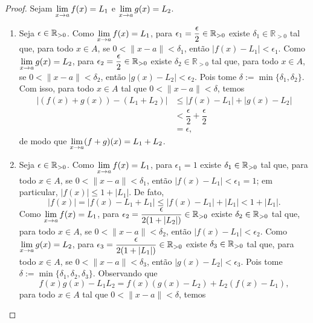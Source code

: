 \begin{proof}
    Sejam $\displaystyle \lim_{x \to a} f(x) = L_1$ e $\displaystyle \lim_{x \to a} g(x) = L_2$.
        \begin{enumerate}[leftmargin=*, align=left, label=\textbf{(\alph*)}]
            \item Seja $\epsilon \in \mathbb{R}_{>0}$. Como $\displaystyle \lim_{x \to a} f(x) = L_1$, para $\displaystyle \epsilon_1 = \dfrac{\epsilon}{2} \in \mathbb{R}_{>0}$ existe $\delta_1 \in \mathbb{R}_{>0}$ tal que, para todo $x \in A$, se $0<\|x-a\|<\delta_1$, então $|f(x) - L_1| < \epsilon_1$. Como $\displaystyle \lim_{x \to a} g(x) = L_2$, para $\displaystyle \epsilon_2 = \dfrac{\epsilon}{2} \in \mathbb{R}_{>0}$ existe $\delta_2 \in \mathbb{R}_{>0}$ tal que, para todo $x \in A$, se $0<\|x-a\|<\delta_2$, então $|g(x) - L_2| < \epsilon_2$. Pois tome $\delta := \min \{\delta_1, \delta_2 \}$. Com isso, para todo $x \in A$ tal que $0 < \|x-a\| < \delta$, temos
                \begin{align*}
                    |(f(x) + g(x)) - (L_1 + L_2)|
                        &\leq |f(x) - L_1| + |g(x) - L_2| \\
                        &< \dfrac{\epsilon}{2} + \dfrac{\epsilon}{2} \\
                        &= \epsilon,
                \end{align*}
            de modo que $\displaystyle \lim_{x \to a} (f+g)(x) = L_1 + L_2$. \blackproof
            \item Seja $\epsilon \in \mathbb{R}_{>0}$. Como $\displaystyle \lim_{x \to a} f(x) = L_1$, para $\epsilon_1 = 1$ existe $\delta_1 \in \mathbb{R}_{>0}$ tal que, para todo $x \in A$, se $0<\|x-a\|<\delta_1$, então $|f(x) - L_1| < \epsilon_1 = 1$; em particular, $|f(x)| \leq 1 + |L_1|$. De fato, 
                \[
                    |f(x)| = |f(x) - L_1 + L_1| \leq |f(x) - L_1| + |L_1| < 1 + |L_1|.
                \]
            Como $\displaystyle \lim_{x \to a} f(x) = L_1$, para $\displaystyle \epsilon_2 = \dfrac{\epsilon}{2(1 + |L_2|)} \in \mathbb{R}_{>0}$ existe $\delta_2 \in \mathbb{R}_{>0}$ tal que, para todo $x \in A$, se $0<\|x-a\|<\delta_2$, então $|f(x) - L_1| < \epsilon_2$. Como $\displaystyle \lim_{x \to a} g(x) = L_2$, para $\epsilon_3 = \dfrac{\epsilon}{2(1 + |L_1|)} \in \mathbb{R}_{>0}$ existe $\delta_3 \in \mathbb{R}_{>0}$ tal que, para todo $x \in A$, se $0<\|x-a\|<\delta_3$, então $|g(x) - L_2| < \epsilon_3$. Pois tome $\delta := \min \{\delta_1, \delta_2, \delta_3 \}$. Observando que
                \[
                    f(x) g(x) - L_1 L_2 = f(x) (g(x) - L_2) + L_2 (f(x) - L_1),
                \]
            para todo $x \in A$ tal que $0 < \|x-a\| < \delta$, temos

\end{enumerate}
\end{proof}
